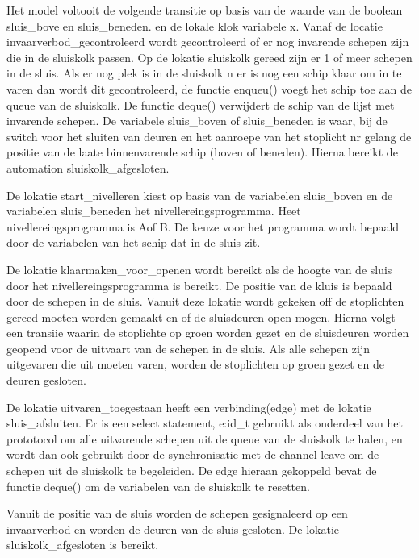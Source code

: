 \begin{thebibliography}{99}
{{Het model voltooit de volgende transitie op basis van de waarde van de boolean sluis_bove en sluis_beneden. en de lokale klok variabele x.
Vanaf de locatie invaarverbod_gecontroleerd  wordt gecontroleerd of er nog invarende schepen zijn die in de sluiskolk passen.
Op de lokatie sluiskolk gereed zijn er 1 of meer schepen in de sluis. Als er nog plek is in de sluiskolk n er is nog een schip klaar om in te varen dan wordt dit gecontroleerd, de functie enqueu() voegt het schip toe aan de queue van de sluiskolk. De functie deque() verwijdert de schip van de lijst met invarende schepen. De variabele sluis_boven of sluis_beneden is waar, bij de switch voor het sluiten van deuren en het aanroepe van het stoplicht nr gelang de positie van  de laate binnenvarende schip (boven of beneden). Hierna bereikt de automation sluiskolk_afgesloten.



De lokatie start_nivelleren kiest op basis van de variabelen sluis_boven en de variabelen sluis_beneden het nivellereingsprogramma.
Heet nivellereingsprogramma is Aof B. De keuze voor het programma wordt bepaald door de variabelen van het schip dat in de sluis zit.

De lokatie klaarmaken_voor_openen wordt bereikt als de   hoogte van de sluis  door het nivellereingsprogramma is bereikt.
De positie van de kluis is bepaald door de schepen in de sluis. Vanuit deze lokatie wordt gekeken off de stoplichten gereed moeten worden gemaakt en of de sluisdeuren open mogen.
Hierna volgt een transiie waarin de stoplichte op groen worden gezet en de sluisdeuren worden geopend voor de uitvaart van de schepen in de sluis.
Als alle schepen zijn uitgevaren die uit moeten varen, worden de stoplichten op groen gezet en de deuren gesloten.


De lokatie uitvaren_toegestaan heeft een verbinding(edge) met de lokatie sluis_afsluiten.
Er is een select statement, e:id_t gebruikt als onderdeel van het prototocol om alle uitvarende schepen uit de queue van de sluiskolk te halen, en wordt dan ook gebruikt door de synchronisatie met de channel leave om de schepen uit de sluiskolk te begeleiden. De edge hieraan gekoppeld bevat de functie deque() om de variabelen  van de sluiskolk te resetten.

Vanuit de positie van de sluis worden de schepen gesignaleerd op een invaarverbod en worden de deuren van de sluis gesloten.
De lokatie sluiskolk_afgesloten is bereikt.

}}
\end{thebibliography}
